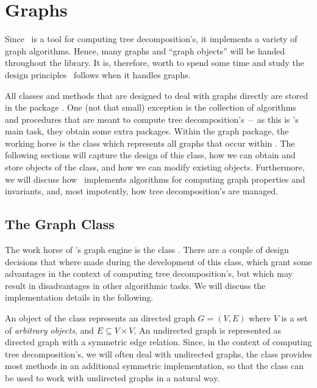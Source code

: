 \documentclass[a4paper, ukenglish, twoside, openright]{jdrasilmanual}
\author{Max Bannach, Sebastian Berndt, Thorsten Ehlers}
\begin{document}
\part{Graphs}
Since \Jdrasil\ is a tool for computing tree decomposition's, it
implements a variety of graph algorithms. Hence, many graphs and
``graph objects'' will be handed throughout the library. It is,
therefore, worth to spend some time and study the design principles
\Jdrasil\ follows when it handles graphs.

All classes and methods that are designed to deal with graphs directly
are stored in the package . One (not that small)
exception is the collection of algorithms and procedures that are
meant to compute tree decomposition's~–~as this is \Jdrasil's main
task, they obtain some extra packages. Within the graph package, the
working horse is the class  which represents all graphs
that occur within \Jdrasil. The following sections will capture the
design of this class, how we can obtain and store objects of the
class, and how we can modify existing 
objects. Furthermore, we will discuss how \Jdrasil\ implements
algorithms for computing graph properties and invariants, and, most
impotently, how tree decomposition's are managed.

\chapter{The Graph Class}
The work horse of \Jdrasil's graph engine is the class
. There are a couple of design decisions
that where made during the development of this class, which grant some
advantages in the context of computing tree decomposition's, but which
may result in disadvantages in other algorithmic tasks. We will
discuss the implementation details in the following. 

An object of the  class represents an directed graph
$G=(V, E)$ where $V$ is a set of \emph{arbitrary objects}, and
$E\subseteq V\times V$. An undirected graph is represented as directed
graph with a symmetric edge relation. Since, in the context of
computing tree decomposition's, we will often deal with undirected
graphs, the class provides most methods in an additional symmetric
implementation, so that the  class can be used to work
with undirected graphs in a natural way.
\end{document}
